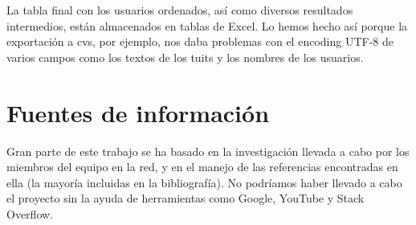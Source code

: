La tabla final con los usuarios ordenados, así como diversos resultados intermedios, están almacenados en tablas
de Excel. Lo hemos hecho así porque la exportación a cvs, por ejemplo, nos daba problemas con el 
encoding UTF-8 de varios campos como los textos de los tuits y los nombres de los usuarios.

\section{Fuentes de información}
Gran parte de este trabajo se ha basado en la investigación llevada a cabo por los miembros del equipo
en la red, y en el manejo de las referencias encontradas en ella (la mayoría incluidas en la bibliografía).
No podríamos haber llevado a cabo el proyecto sin la ayuda de herramientas como Google, YouTube
y Stack Overflow.
